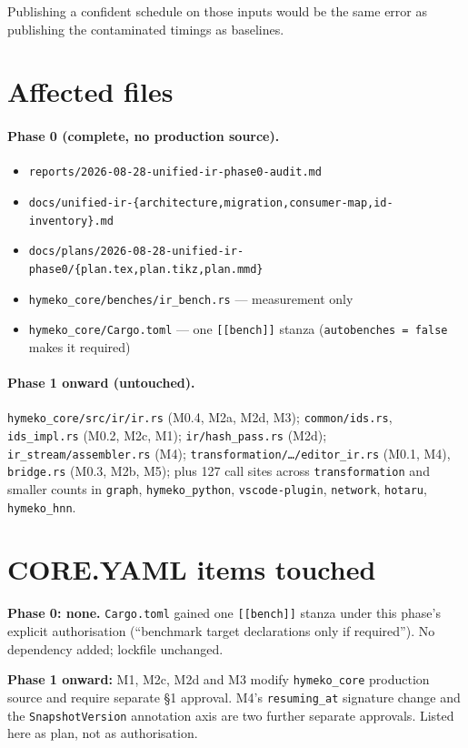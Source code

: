 \documentclass[11pt,a4paper]{article}
\newcommand{\code}[1]{\texttt{#1}}
\begin{document}
Publishing a confident schedule on those inputs would be the same error as
publishing the contaminated timings as baselines.

\section{Affected files}

\paragraph{Phase 0 (complete, no production source).}
\begin{itemize}\itemsep2pt
  \item \code{reports/2026-08-28-unified-ir-phase0-audit.md}
  \item \code{docs/unified-ir-\{architecture,migration,consumer-map,id-inventory\}.md}
  \item \code{docs/plans/2026-08-28-unified-ir-phase0/\{plan.tex,plan.tikz,plan.mmd\}}
  \item \code{hymeko\_core/benches/ir\_bench.rs} --- measurement only
  \item \code{hymeko\_core/Cargo.toml} --- one \code{[[bench]]} stanza
        (\code{autobenches = false} makes it required)
\end{itemize}

\paragraph{Phase 1 onward (untouched).}
\code{hymeko\_core/src/ir/ir.rs} (M0.4, M2a, M2d, M3);
\code{common/ids.rs}, \code{ids\_impl.rs} (M0.2, M2c, M1);
\code{ir/hash\_pass.rs} (M2d);
\code{ir\_stream/assembler.rs} (M4);
\code{transformation/\ldots/editor\_ir.rs} (M0.1, M4),
\code{bridge.rs} (M0.3, M2b, M5);
plus 127 call sites across \code{transformation} and smaller counts in
\code{graph}, \code{hymeko\_python}, \code{vscode-plugin}, \code{network},
\code{hotaru}, \code{hymeko\_hnn}.

\section{CORE.YAML items touched}

\textbf{Phase 0: none.} \code{Cargo.toml} gained one \code{[[bench]]} stanza
under this phase's explicit authorisation (``benchmark target declarations only
if required''). No dependency added; lockfile unchanged.

\textbf{Phase 1 onward:} M1, M2c, M2d and M3 modify \code{hymeko\_core}
production source and require separate \S1 approval. M4's \code{resuming\_at}
signature change and the \code{SnapshotVersion} annotation axis are two further
separate approvals. Listed here as plan, not as authorisation.
\end{document}
